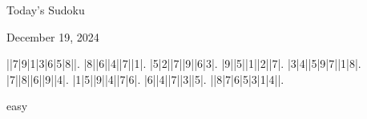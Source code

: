 \documentclass{article}
\begin{document}
\begin{center}
\Huge{Today's Sudoku}
\end{center}
\begin{center}
\Large{December 19, 2024}
\end{center}
\begin{sudoku}
||7|9|1|3|6|5|8||.
|8||6||4||7||1|.
|5|2||7||9||6|3|.
|9||5||1||2||7|.
|3|4||5|9|7||1|8|.
|7||8||6||9||4|.
|1|5||9||4||7|6|.
|6||4||7||3||5|.
||8|7|6|5|3|1|4||.
\end{sudoku}
\begin{center}
easy\end{center}
\end{document}
